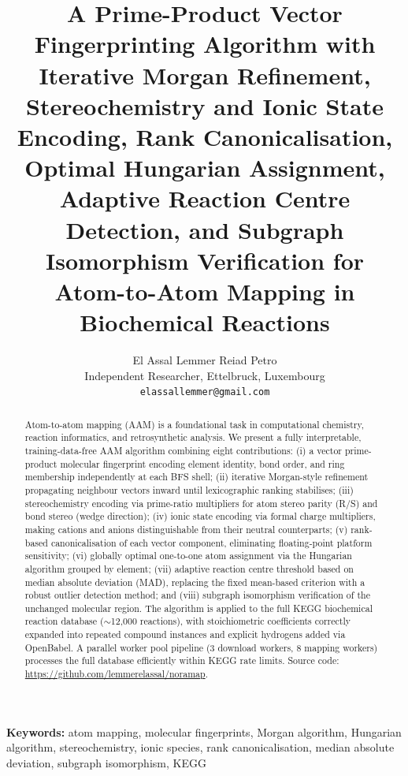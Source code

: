 \documentclass[12pt,a4paper]{article}
\begin{document}
\title{A Prime-Product Vector Fingerprinting Algorithm with Iterative Morgan Refinement,
Stereochemistry and Ionic State Encoding, Rank Canonicalisation,
Optimal Hungarian Assignment, Adaptive Reaction Centre Detection,
and Subgraph Isomorphism Verification for Atom-to-Atom Mapping
in Biochemical Reactions}

\author{El Assal Lemmer Reiad Petro\\
\small Independent Researcher, Ettelbruck, Luxembourg\\
\small \texttt{elassallemmer@gmail.com}}

\date{}
\maketitle

\begin{abstract}
Atom-to-atom mapping (AAM) is a foundational task in computational chemistry,
reaction informatics, and retrosynthetic analysis.
We present a fully interpretable, training-data-free AAM algorithm combining
eight contributions:
(i) a vector prime-product molecular fingerprint encoding element identity,
bond order, and ring membership independently at each BFS shell;
(ii) iterative Morgan-style refinement propagating neighbour vectors inward
until lexicographic ranking stabilises;
(iii) stereochemistry encoding via prime-ratio multipliers for atom stereo
parity (R/S) and bond stereo (wedge direction);
(iv) ionic state encoding via formal charge multipliers, making cations and
anions distinguishable from their neutral counterparts;
(v) rank-based canonicalisation of each vector component, eliminating
floating-point platform sensitivity;
(vi) globally optimal one-to-one atom assignment via the Hungarian algorithm
grouped by element;
(vii) adaptive reaction centre threshold based on median absolute deviation
(MAD), replacing the fixed mean-based criterion with a robust outlier
detection method; and
(viii) subgraph isomorphism verification of the unchanged molecular region.
The algorithm is applied to the full KEGG biochemical reaction database
($\sim$12,000 reactions), with stoichiometric coefficients correctly expanded
into repeated compound instances and explicit hydrogens added via OpenBabel.
A parallel worker pool pipeline (3 download workers, 8 mapping workers)
processes the full database efficiently within KEGG rate limits.
Source code: \url{https://github.com/lemmerelassal/noramap}.
\end{abstract}

\noindent\textbf{Keywords:} atom mapping, molecular fingerprints, Morgan algorithm,
Hungarian algorithm, stereochemistry, ionic species, rank canonicalisation,
median absolute deviation, subgraph isomorphism, KEGG
\end{document}
